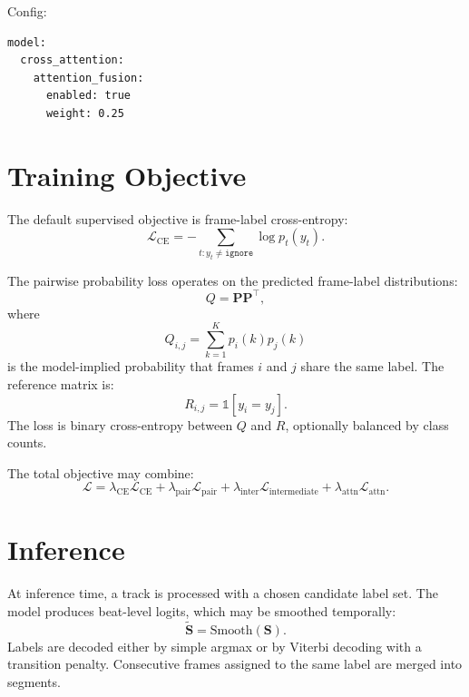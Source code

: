 \documentclass[11pt,a4paper]{article}
\newcommand{\logits}{\mathbf{S}}
\newcommand{\probs}{\mathbf{P}}
\newcommand{\ignore}{\mathtt{ignore}}
\begin{document}
Config:
\begin{verbatim}
model:
  cross_attention:
    attention_fusion:
      enabled: true
      weight: 0.25
\end{verbatim}

\section{Training Objective}

The default supervised objective is frame-label cross-entropy:
\begin{equation}
  \mathcal{L}_{\mathrm{CE}}
  =
  - \sum_{t : y_t \ne \ignore}
  \log p_t(y_t).
\end{equation}

The pairwise probability loss operates on the predicted frame-label distributions:
\begin{equation}
  Q = \probs \probs^\top,
\end{equation}
where
\begin{equation}
  Q_{i,j} = \sum_{k=1}^{K} p_i(k)p_j(k)
\end{equation}
is the model-implied probability that frames $i$ and $j$ share the same label. The
reference matrix is:
\begin{equation}
  R_{i,j} = \mathbb{1}[y_i = y_j].
\end{equation}
The loss is binary cross-entropy between $Q$ and $R$, optionally balanced by class
counts.

The total objective may combine:
\begin{equation}
  \mathcal{L}
  =
  \lambda_{\mathrm{CE}}\mathcal{L}_{\mathrm{CE}}
  +
  \lambda_{\mathrm{pair}}\mathcal{L}_{\mathrm{pair}}
  +
  \lambda_{\mathrm{inter}}\mathcal{L}_{\mathrm{intermediate}}
  +
  \lambda_{\mathrm{attn}}\mathcal{L}_{\mathrm{attn}}.
\end{equation}

\section{Inference}

At inference time, a track is processed with a chosen candidate label set. The model
produces beat-level logits, which may be smoothed temporally:
\begin{equation}
  \tilde{\logits} = \mathrm{Smooth}(\logits).
\end{equation}
Labels are decoded either by simple argmax or by Viterbi decoding with a transition
penalty. Consecutive frames assigned to the same label are merged into segments.
\end{document}
